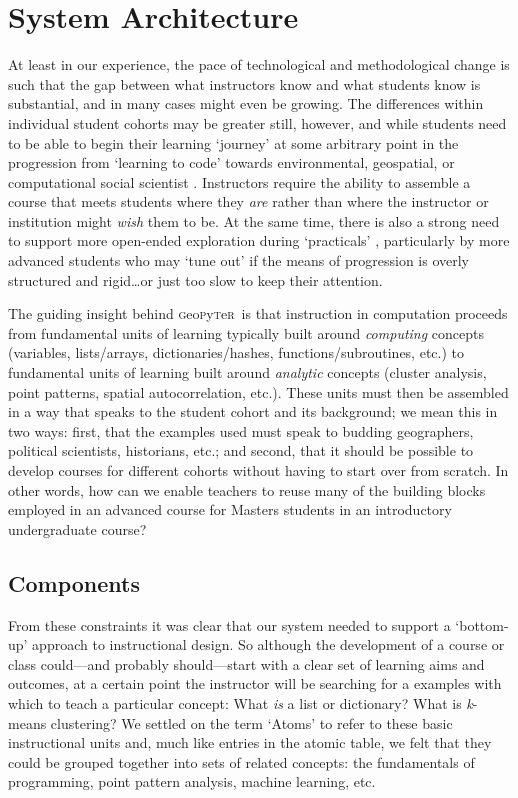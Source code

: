 \documentclass[letter, 11pt,titlepage]{article}
\newcommand{\gp}{\textsc{g}eo\textsc{p}y\textsc{t}e\textsc{r}~\/}
\begin{document}
\section{System Architecture}\label{system-architecture}

At least in our experience, the pace of technological and methodological change
is such that the gap between what instructors know and what students know is
substantial, and in many cases might even be growing. The differences within
individual student cohorts may be greater still, however, and while students
need to be able to begin their learning `journey' at some arbitrary point in the
progression from `learning to code' towards environmental, geospatial, or computational social scientist \citep{Lazer2009}. Instructors require the ability to assemble a course that meets students where they \emph{are} rather than where the instructor or institution might \emph{wish} them to be. At the same time, there is also a strong need to support more open-ended exploration during `practicals' \citep{Unwin1980}, particularly by more advanced students who may `tune out' if the means of progression is overly structured and rigid\ldots or just too slow to keep their attention.

The guiding insight behind \gp is that instruction in computation proceeds from
fundamental units of learning typically built around \textit{computing} concepts
(variables, lists/arrays, dictionaries/hashes, functions/subroutines, etc.) to
fundamental units of learning built around \textit{analytic} concepts (cluster
analysis, point patterns, spatial autocorrelation, etc.). These units must then
be assembled in a way that speaks to the student cohort and its background; we
mean this in two ways: first, that the examples used must speak to budding
geographers, political scientists, historians, etc.; and second, that it should
be possible to develop courses for different cohorts without having to start
over from scratch. In other words, how can we enable teachers to reuse many of
the building blocks employed in an advanced course for Masters students in an
introductory undergraduate course?

\subsection{Components}\label{components}

From these constraints it was clear that our system needed to support a
`bottom-up' approach to instructional design. So although the development of a
course or class could---and probably should---start with a clear set of learning
aims and outcomes, at a certain point the instructor will be searching for a
examples with which to teach a particular concept: What \emph{is} a list or
dictionary? What is \textit{k}-means clustering? We settled on the term `Atoms'
to refer to these basic instructional units and, much like entries in the atomic
table, we felt that they could be grouped together into sets of related
concepts: the fundamentals of programming, point pattern analysis, machine
learning, etc.
\end{document}
